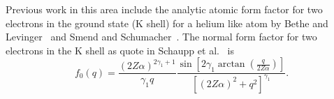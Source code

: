     Previous work in this area include the analytic atomic form factor
    for two electrons in the ground state (K shell) for a helium like atom by
    Bethe and Levinger~\cite{Bethe-Levinger} and Smend and
    Schumacher~\cite{Smend-Schumacher}. The normal form factor for two electrons in the
    K shell as quote in Schaupp et al.~\cite{Schaupp-1983} is
    \begin{equation}
        f_0(q) = \frac{(2Z\alpha)^{2\gamma_1 + 1}}{\gamma_1 q}
                \frac{ \sin[2\gamma_1 \arctan(\frac{q}{2Z\alpha}) ] }{
                    [(2Z\alpha)^2 + q^2]^{\gamma_1}
                }.
    \end{equation}

